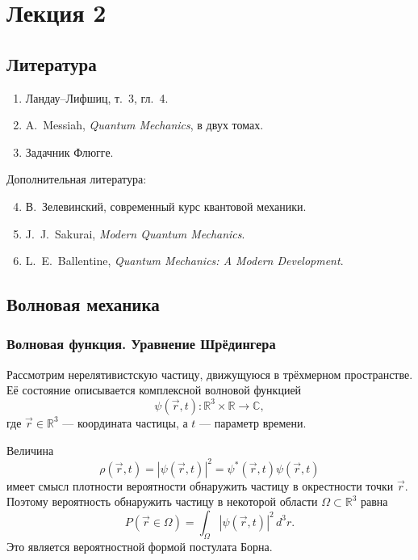 \documentclass[12pt,a4paper]{article}
\begin{document}
\tableofcontents
\clearpage
\section{Лекция 2}

\subsection*{Литература}

\begin{enumerate}
    \item Ландау--Лифшиц, т.~3, гл.~4.
    \item A.~Messiah, \textit{Quantum Mechanics}, в двух томах.
    \item Задачник Флюгге.
\end{enumerate}

Дополнительная литература:
\begin{enumerate}
    \setcounter{enumi}{3}
    \item В.~Зелевинский, современный курс квантовой механики.
    \item J.~J.~Sakurai, \textit{Modern Quantum Mechanics}.
    \item L.~E.~Ballentine, \textit{Quantum Mechanics: A Modern Development}.
\end{enumerate}


\subsection{Волновая механика}

\subsubsection{Волновая функция. Уравнение Шрёдингера}

Рассмотрим нерелятивистскую частицу, движущуюся в трёхмерном
пространстве. Её состояние описывается комплексной волновой функцией
\[
    \boxed{
        \psi(\vec r,t):
        \mathbb R^3\times\mathbb R\longrightarrow\mathbb C
    },
\]
где $\vec r\in\mathbb R^3$ --- координата частицы, а $t$ --- параметр
времени.

Величина
\[
    \boxed{
        \rho(\vec r,t)
        =
        |\psi(\vec r,t)|^2
        =
        \psi^*(\vec r,t)\psi(\vec r,t)
    }
\]
имеет смысл плотности вероятности обнаружить частицу в окрестности
точки $\vec r$. Поэтому вероятность обнаружить частицу в некоторой
области $\Omega\subset\mathbb R^3$ равна
\[
    \boxed{
        P(\vec r\in\Omega)
        =
        \int_\Omega
            |\psi(\vec r,t)|^2\,d^3r
    }.
\]
Это является вероятностной формой постулата Борна.
\end{document}
